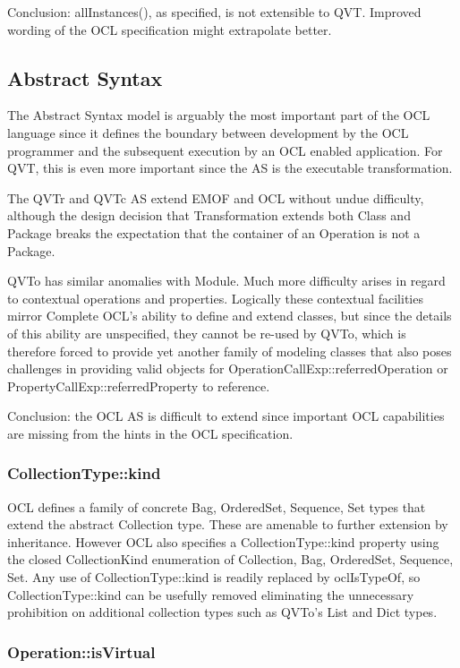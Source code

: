 \documentclass{llncs}
\begin{document}
Conclusion: allInstances(), as specified, is not extensible to QVT. Improved wording of the OCL specification might extrapolate better. 

\subsection{Abstract Syntax}\label{Abstract Syntax}

The Abstract Syntax model is arguably the most important part of the OCL language since it defines the boundary between development by the OCL programmer and the subsequent execution by an OCL enabled application. For QVT, this is even more important since the AS is the executable transformation.

The QVTr and QVTc AS extend EMOF and OCL without undue difficulty, although the design decision that Transformation extends both Class and Package breaks the expectation that the container of an Operation is not a Package.

QVTo has similar anomalies with Module. Much more difficulty arises in regard to contextual operations and properties. Logically these contextual facilities mirror Complete OCL's ability to define and extend classes, but since the details of this ability are unspecified, they cannot be re-used by QVTo, which is therefore forced to provide yet another family of modeling classes that also poses challenges in providing valid objects for OperationCallExp::referredOperation or PropertyCallExp::referredProperty to reference.

Conclusion: the OCL AS is difficult to extend since important OCL capabilities are missing from the hints in the OCL specification.    

\subsubsection{CollectionType::kind}

OCL defines a family of concrete Bag, OrderedSet, Sequence, Set types that extend the abstract Collection type. These are amenable to further extension by inheritance. However OCL also specifies a CollectionType::kind property using the closed CollectionKind enumeration of Collection, Bag, OrderedSet, Sequence, Set. Any use of CollectionType::kind is readily replaced by oclIsTypeOf, so CollectionType::kind can be usefully removed eliminating the unnecessary prohibition on additional collection types such as QVTo's List and Dict types. 

\subsubsection{Operation::isVirtual}
\end{document}
